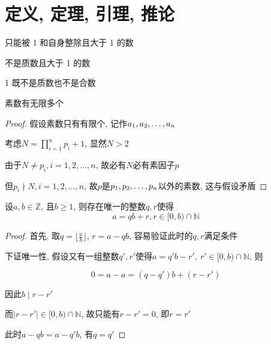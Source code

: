 \section{定义, 定理, 引理, 推论}

\begin{definition}[素数/质数]
	只能被 1 和自身整除且大于 1 的数
\end{definition}

\begin{definition}[合数]
	不是质数且大于 1 的数
\end{definition}

\begin{remark}
	1 既不是质数也不是合数
\end{remark}

\begin{theorem}
	\label{prime:infPrime}
	
	素数有无限多个
	
	\begin{proof}

		假设素数只有有限个,
		记作\(\def\enum#1{a_{ #1}}\enum{1},\enum{2},\dots,\enum{n}\)
		
		考虑\(N=\prod_{i=1}^np_i+1\), 显然\(N>2\)
		
		由于\(N\ne p_i,i=1,2,\dots,n\), 故必有\(N\)必有素因子\(p\)
		
		但\(p_i\nmid N,i=1,2,\dots,n\),
		故\(p\)是\(\def\enum#1{p_{ #1}}\enum{1},\enum{2},\dots,\enum{n}\)以外的素数,
		这与假设矛盾
		
	\end{proof}
\end{theorem}

\begin{lemma}[带余除法]
	\label{div:divWithRemaining}
	设\(a,b\in\mathbb{Z}\), 且\(b\geqslant1\), 则存在唯一的整数\(q,r\)使得
	\begin{equation}
		a=qb+r,r\in[0,b)\cap\mathbb{N}
	\end{equation}
	
	\begin{proof}
		首先, 取\(q=\lfloor\frac{a}{b}\rfloor\), \(r=a-qb\),
		容易验证此时的\(q,r\)满足条件
		
		下证唯一性, 假设又有一组整数\(q',r'\)使得\(a=q'b-r',~r'\in[0,b)\cap\mathbb{N}\),
		则
		
		\begin{equation}
			0=a-a=(q-q')b+(r-r')
		\end{equation}
		
		因此\(b\mid r-r'\)
		
		而\(|r-r'|\in[0,b)\cap\mathbb{N}\), 故只能有\(r-r'=0\), 即\(r=r'\)
		
		此时\(a-qb=a-q'b\), 有\(q=q'\)
		
	\end{proof}
	
\end{lemma}

